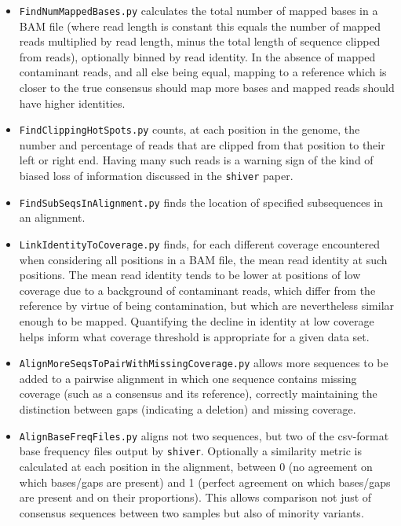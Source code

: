 \documentclass{article}
\newcommand{\shiv}{\texttt{shiver}\xspace}
\begin{document}
\begin{itemize}
\item \texttt{FindNumMappedBases.py} calculates the total number of mapped bases in a BAM file (where read length is constant this equals the number of mapped reads multiplied by read length, minus the total length of sequence clipped from reads), optionally binned by read identity.
In the absence of mapped contaminant reads, and all else being equal, mapping to a reference which is closer to the true consensus should map more bases and mapped reads should have higher identities.

\item \texttt{FindClippingHotSpots.py} counts, at each position in the genome, the number and percentage of reads that are clipped from that position to their left or right end.
Having many such reads is a warning sign of the kind of biased loss of information discussed in the \shiv paper.

\item \texttt{FindSubSeqsInAlignment.py} finds the location of specified subsequences in an alignment.

\item \texttt{LinkIdentityToCoverage.py} finds, for each different coverage encountered when considering all positions in a BAM file, the mean read identity at such positions.
The mean read identity tends to be lower at positions of low coverage due to a background of contaminant reads, which differ from the reference by virtue of being contamination, but which are nevertheless similar enough to be mapped.
Quantifying the decline in identity at low coverage helps inform what coverage threshold is appropriate for a given data set.

\item \texttt{AlignMoreSeqsToPairWithMissingCoverage.py} allows more sequences to be added to a pairwise alignment in which one sequence contains missing coverage (such as a consensus and its reference), correctly maintaining the distinction between gaps (indicating a deletion) and missing coverage.

\item \texttt{AlignBaseFreqFiles.py} aligns not two sequences, but two of the csv-format base frequency files output by \shiv.
Optionally a similarity metric is calculated at each position in the alignment, between 0 (no agreement on which bases/gaps are present) and 1 (perfect agreement on which bases/gaps are present and on their proportions).
This allows comparison not just of consensus sequences between two samples but also of minority variants.


\end{itemize}
\end{document}
